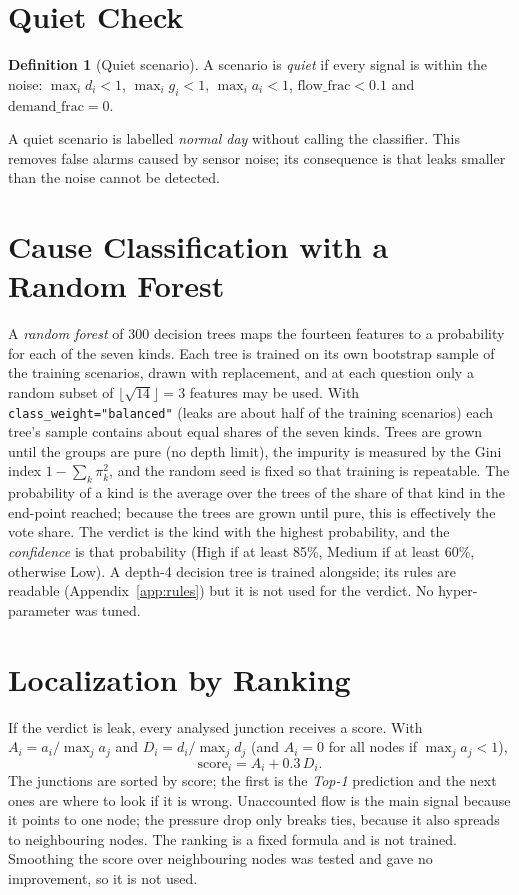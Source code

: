 \documentclass[11pt,letterpaper]{report}
\theoremstyle{definition}
\newtheorem{definition}[theorem]{Definition}
\theoremstyle{plain}
\theoremstyle{remark}
\newcommand{\code}[1]{\texttt{#1}}
\begin{document}
\section{Quiet Check}
\begin{definition}[Quiet scenario]
A scenario is \emph{quiet} if every signal is within the noise: $\max_i d_i<1$, $\max_i g_i<1$, $\max_i a_i<1$, $\text{flow\_frac}<0.1$ and $\text{demand\_frac}=0$.
\end{definition}
A quiet scenario is labelled \emph{normal day} without calling the classifier. This removes false alarms caused by sensor noise; its consequence is that leaks smaller than the noise cannot be detected.

\section{Cause Classification with a Random Forest}\label{sec:rf}
A \emph{random forest} \cite{lucin2021rf,marvin2023hgb} of 300 decision trees maps the fourteen features to a probability for each of the seven kinds. Each tree is trained on its own bootstrap sample of the training scenarios, drawn with replacement, and at each question only a random subset of $\lfloor\sqrt{14}\rfloor=3$ features may be used. With \code{class\_weight="balanced"} (leaks are about half of the training scenarios) each tree's sample contains about equal shares of the seven kinds. Trees are grown until the groups are pure (no depth limit), the impurity is measured by the Gini index $1-\sum_k \pi_k^2$, and the random seed is fixed so that training is repeatable. The probability of a kind is the average over the trees of the share of that kind in the end-point reached; because the trees are grown until pure, this is effectively the vote share. The verdict is the kind with the highest probability, and the \emph{confidence} is that probability (High if at least 85\%, Medium if at least 60\%, otherwise Low). A depth-4 decision tree is trained alongside; its rules are readable (Appendix~\ref{app:rules}) but it is not used for the verdict. No hyper-parameter was tuned.

\section{Localization by Ranking}\label{sec:rank}
If the verdict is leak, every analysed junction receives a score. With $A_i=a_i/\max_j a_j$ and $D_i=d_i/\max_j d_j$ (and $A_i=0$ for all nodes if $\max_j a_j<1$),
\begin{equation}\label{eq:score}
\text{score}_i=A_i+0.3\,D_i .
\end{equation}
The junctions are sorted by score; the first is the \emph{Top-1} prediction and the next ones are where to look if it is wrong. Unaccounted flow is the main signal because it points to one node; the pressure drop only breaks ties, because it also spreads to neighbouring nodes. The ranking is a fixed formula and is not trained. Smoothing the score over neighbouring nodes was tested and gave no improvement, so it is not used.
\end{document}
